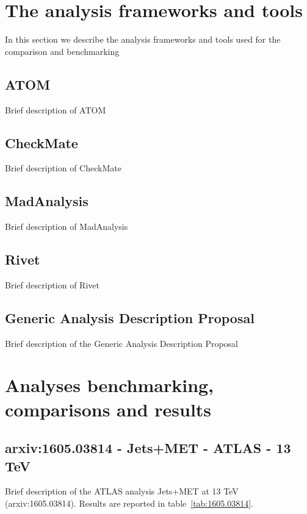 \documentclass[11pt]{cernrep}
\begin{document}
\section{The analysis frameworks and tools}
In this section we describe the analysis frameworks and tools used for the comparison and benchmarking
\subsection{ATOM}
Brief description of ATOM
\subsection{CheckMate}
Brief description of CheckMate
\subsection{MadAnalysis}
Brief description of MadAnalysis
\subsection{Rivet}
Brief description of Rivet
\subsection{Generic Analysis Description Proposal}
Brief description of the Generic Analysis Description Proposal

\section{Analyses benchmarking, comparisons and results}

\subsection{arxiv:1605.03814 - Jets+MET - ATLAS - 13 TeV}
Brief description of the ATLAS analysis Jets+MET at 13 TeV (arxiv:1605.03814). 
Results are reported in table~\ref{tab:1605.03814}.
\end{document}
